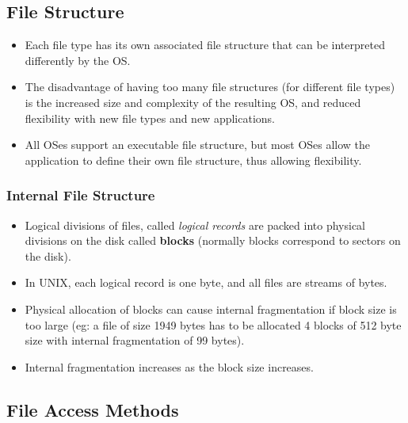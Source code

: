 \documentclass{article}
\theoremstyle{plain}
\theoremstyle{definition}
\begin{document}
\subsection{File Structure}
\begin{itemize}
    \item Each file type has its own associated file structure that can be interpreted differently by the OS.
    
    \item The disadvantage of having too many file structures (for different file types) is the increased size and complexity of the resulting OS, and reduced flexibility with new file types and new applications.
\textit{    
}    \item All OSes support an executable file structure, but most OSes allow the application to define their own file structure, thus allowing flexibility. 
\end{itemize}

\subsubsection{Internal File Structure}
\begin{itemize}
    \item Logical divisions of files, called \textit{logical records} are packed into physical divisions on the disk called \textbf{blocks} (normally blocks correspond to sectors on the disk). 
    
    \item In UNIX, each logical record is one byte, and all files are streams of bytes. 
    
    \item Physical allocation of blocks can cause internal fragmentation if block size is too large (eg: a file of size 1949 bytes has to be allocated 4 blocks of 512 byte size with internal fragmentation of 99 bytes).
    
    \item Internal fragmentation increases as the block size increases.
\end{itemize}

\subsection{File Access Methods}
\end{document}
